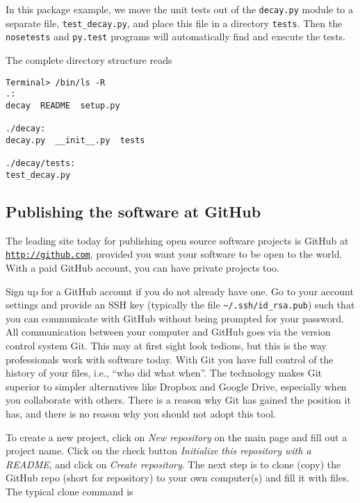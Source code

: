\documentclass[graybox,sectrefs,envcountresetchap,open=right,final]{svmonodo}
\begin{document}
In this package example, we move the unit tests out of the \texttt{decay.py}
module to a separate file, \Verb!test_decay.py!, and place this file in a
directory \texttt{tests}. Then the \texttt{nosetests} and \texttt{py.test} programs will
automatically find and execute the tests.

The complete directory structure reads

\begin{Verbatim}[frame=lines,label=\fbox{{\tiny Terminal}},framesep=2.5mm,framerule=0.7pt,fontsize=\fontsize{9pt}{9pt}]
Terminal> /bin/ls -R
.:
decay  README  setup.py

./decay:
decay.py  __init__.py  tests

./decay/tests:
test_decay.py
\end{Verbatim}

\subsection{Publishing the software at GitHub}


The leading site today for publishing open source software projects is
GitHub at \href{{http://github.com}}{\nolinkurl{http://github.com}}, provided you want your software to
be open to the world. With a paid GitHub account, you can have private
projects too.

Sign up for a GitHub account if you do not already have one.
Go to your account settings and provide an SSH key (typically
the file \Verb!~/.ssh/id_rsa.pub!) such that
you can communicate with GitHub without being prompted for your password.
All communication between your computer and GitHub goes via the version
control system Git. This may at first sight look tedious, but
this is the way professionals work with software today. With Git you
have full control of the history of your files, i.e., ``who did what when''.
The technology makes Git superior to simpler alternatives
like Dropbox and Google Drive,
especially when you collaborate with others.
There is a reason why Git has gained the position it has,
and there is no reason why you should not adopt this tool.

To create a new project, click on \emph{New repository} on the main page and
fill out a project name. Click on the check button \emph{Initialize this
repository with a README}, and click on \emph{Create repository}. The next
step is to clone (copy) the GitHub repo (short for repository) to
your own computer(s) and fill it with files. The typical clone command is
\end{document}

